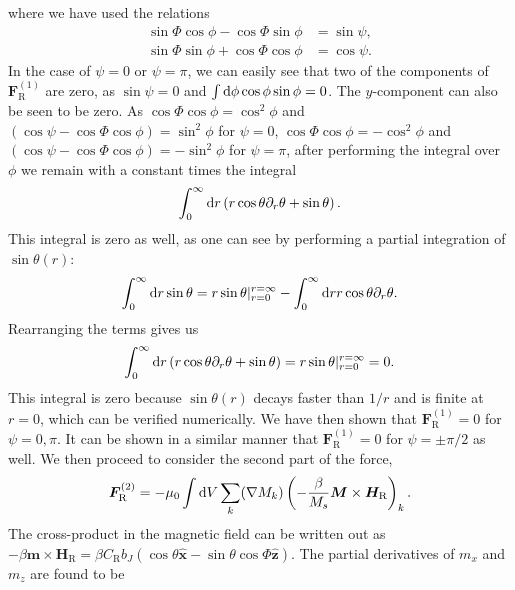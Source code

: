 where we have used the relations
\begin{subequations}
\begin{align}
    \sin\Phi\cos\phi-\cos\Phi\sin\phi &= \sin\psi, \\
    \sin\Phi\sin\phi+\cos\Phi\cos\phi &= \cos\psi.
\end{align}
\end{subequations}
In the case of $\psi = 0$ or $\psi=\pi$, we can easily see that two of the components of $\mathbold{F}_{\text{R}}^{(1)}$ are zero, as $\sin\psi=0$ and $\int\operatorname{d}\!{\phi} \cos\phi\sin\phi = 0$. The $y$-component can also be seen to be zero. As $\cos\Phi\cos\phi = \cos^2\phi$ and $(\cos\psi-\cos\Phi\cos\phi) = \sin^2\phi$ for $\psi = 0$, $\cos\Phi\cos\phi = -\cos^2\phi$ and $(\cos\psi-\cos\Phi\cos\phi) = -\sin^2\phi$ for $\psi = \pi$, after performing the integral over $\phi$ we remain with a constant times the integral 
\begin{align}
\int_0^{\infty} \operatorname{d}\!{r} \left(r\cos\theta\partial_r \theta + \sin\theta\right).
\end{align}
This integral is zero as well, as one can see by performing a partial integration of $\sin\theta(r)$:
\begin{align}
\int_0^{\infty} \operatorname{d}\!{r} \sin\theta = r\sin\theta|_{r = 0}^{r=\infty} - \int_0^{\infty} \operatorname{d}\!{r} r\cos\theta\partial_r \theta.
\end{align}
Rearranging the terms gives us
\begin{align}
\int_0^{\infty} \operatorname{d}\!{r} \left(r\cos\theta\partial_r \theta + \sin\theta\right) = r\sin\theta|_{r = 0}^{r=\infty} = 0.
\end{align}
This integral is zero because $\sin\theta(r)$ decays faster than $1/r$ and is finite at $r=0$, which can be verified numerically. We have then shown that $\mathbold{F}_{\text{R}}^{(1)} = 0$ for $\psi = 0, \pi$. It can be shown in a similar manner that $\mathbold{F}_{\text{R}}^{(1)} = 0$ for $\psi=\pm\pi/2$ as well. We then proceed to consider the second part of the force,
\begin{align}
    \mathbold{F}_{\text{R}}^{(2)} = -\mu_0\int\d V\sum_k(\mathbold{\nabla}M_k)\left(-\frac{\beta}{M_s}\mathbold{M}\times\mathbold{H}_{\text{R}}\right)_k.
    \label{eq:FR2}
\end{align}
The cross-product in the magnetic field can be written out as $-\beta\mathbold{m}\times\mathbold{H}_{\text{R}} = \beta C_{\text{R}} b_J ( \cos\theta \mathbold{\hat{x}} - \sin\theta\cos\Phi\mathbold{\hat{z}} )$. The partial derivatives of $m_x$ and $m_z$ are found to be
